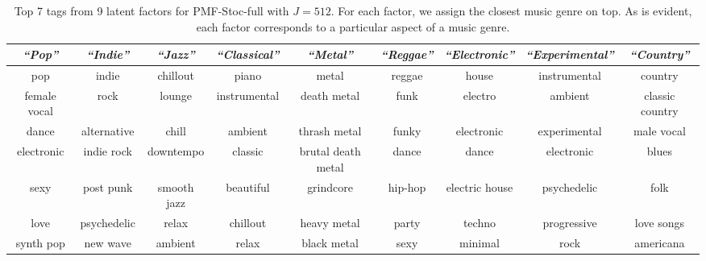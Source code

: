 \begin{table}
\footnotesize
\centering
\begin{tabular}{ ccccccccc }
\toprule
\hspace{-6pt}\emph{``Pop''} &  \emph{``Indie''} &  \emph{``Jazz''} & \emph{``Classical''} & \emph{``Metal''} & \emph{``Reggae''} & \emph{``Electronic''} & \emph{``Experimental''} & \emph{``Country''} \hspace{-6pt}\\
\hline
\hspace{-6pt}pop & indie & chillout & piano & metal & reggae & house & instrumental  & country\hspace{-6pt}\\ 
\hspace{-6pt}female vocal & rock & lounge & instrumental & death metal  & funk & electro & ambient & classic country\hspace{-6pt} \\ 
\hspace{-6pt}dance & alternative & chill & ambient & thrash metal  & funky & electronic & experimental & male vocal\hspace{-6pt} \\ 
\hspace{-6pt}electronic & indie rock & downtempo & classic & brutal death metal  & dance & dance & electronic & blues\hspace{-6pt}\\ 
\hspace{-6pt}sexy & post punk & smooth jazz & beautiful & grindcore  & hip-hop & electric house & psychedelic & folk\hspace{-6pt} \\ 
\hspace{-6pt}love & psychedelic & relax & chillout & heavy metal  & party & techno & progressive & love songs\hspace{-6pt}\\
\hspace{-6pt}synth pop & new wave & ambient & relax & black metal & sexy & minimal & rock & americana \hspace{-6pt}\\
\bottomrule
\end{tabular}
\caption{Top 7 tags from 9 latent factors for PMF-Stoc-full with $J=512$. For each factor, we assign the closest music genre on top. As is evident, each factor corresponds to a particular aspect of a music genre.}\label{tab:factors}
\normalsize
\end{table}


